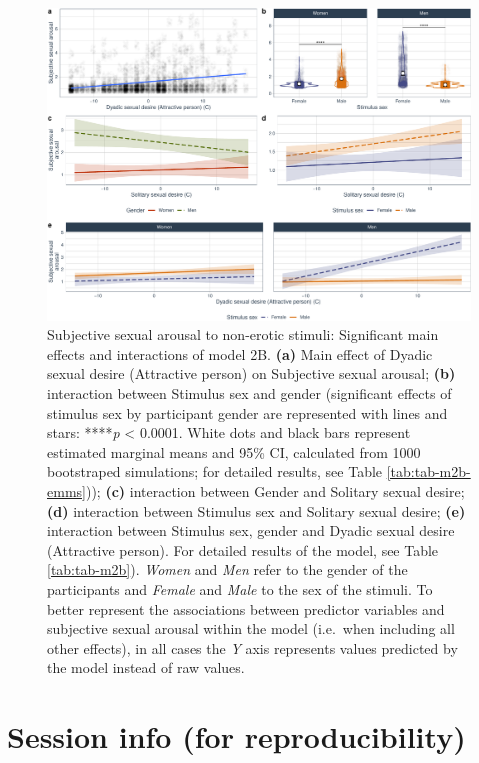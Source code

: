 \documentclass[
  bookmarksnumbered]{article}
\begin{document}
\begin{figure}
\centering
\includegraphics{Deseo_excitacion_sexual_files/figure-latex/fig-h2b-1.pdf}
\caption{\label{fig:fig-h2b}Subjective sexual arousal to non-erotic stimuli: Significant main effects and interactions of model 2B. \textbf{(a)} Main effect of Dyadic sexual desire (Attractive person) on Subjective sexual arousal; \textbf{(b)} interaction between Stimulus sex and gender (significant effects of stimulus sex by participant gender are represented with lines and stars: ****\emph{p} \textless{} 0.0001. White dots and black bars represent estimated marginal means and 95\% CI, calculated from 1000 bootstraped simulations; for detailed results, see Table \ref{tab:tab-m2b-emms})); \textbf{(c)} interaction between Gender and Solitary sexual desire; \textbf{(d)} interaction between Stimulus sex and Solitary sexual desire; \textbf{(e)} interaction between Stimulus sex, gender and Dyadic sexual desire (Attractive person). For detailed results of the model, see Table \ref{tab:tab-m2b}). \emph{Women} and \emph{Men} refer to the gender of the participants and \emph{Female} and \emph{Male} to the sex of the stimuli. To better represent the associations between predictor variables and subjective sexual arousal within the model (i.e.~when including all other effects), in all cases the \emph{Y} axis represents values predicted by the model instead of raw values.}
\end{figure}

\hypertarget{session}{%
\section{Session info (for reproducibility)}\label{session}}
\end{document}

